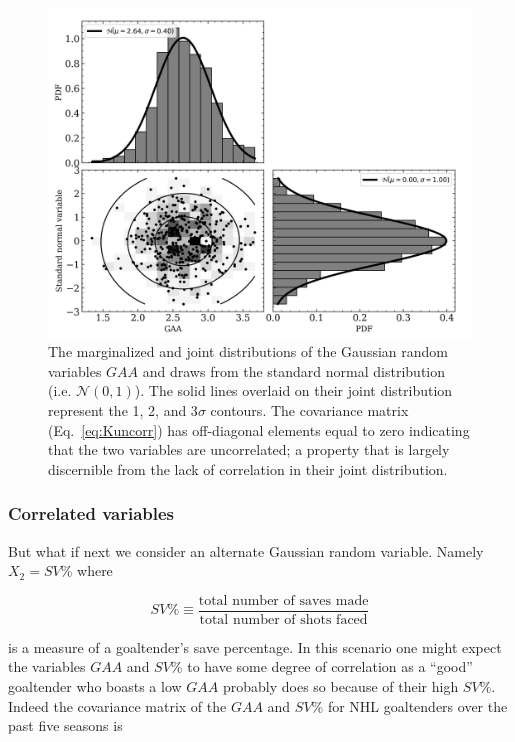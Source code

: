 \begin{figure}
  \centering
  \includegraphics[width=.9\textwidth]{figures/uncorr_2d.png}
  \caption[Uncorrelated Gaussian random variables in two dimensions.]
      {The marginalized and joint distributions of the Gaussian random
        variables $GAA$ and draws from the standard normal distribution (i.e. $\mathcal{N}(0,1)$).
        The solid
    lines overlaid on their joint distribution represent the 1, 2, and 3$\sigma$
    contours. The covariance matrix (Eq.~\ref{eq:Kuncorr}) has off-diagonal
    elements equal to zero indicating that the two variables are uncorrelated;
    a property that is largely discernible from the lack of correlation in their joint
    distribution.}
  \label{fig:uncorr2d}
\end{figure}

\subsubsection{Correlated variables}
But what if next we consider an alternate Gaussian random variable. Namely
$X_2 = SV$\% where

\begin{equation}
  SV\% \equiv \frac{\text{total number of saves made}}{\text{total number of shots faced}}
\end{equation}

\noindent is a measure of a goaltender's save percentage. In this scenario one
might expect the variables $GAA$ and $SV$\% to have some degree of correlation
as a ``good'' goaltender who boasts a low $GAA$ probably does so because of their
high $SV$\%. Indeed the covariance matrix of the $GAA$ and $SV$\% for NHL
goaltenders over the past five seasons is

